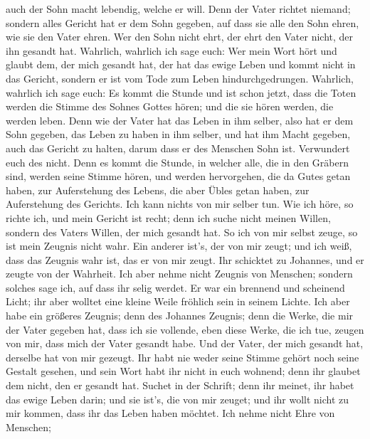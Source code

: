 auch der Sohn macht lebendig, welche er will.  Denn der
Vater richtet niemand; sondern alles Gericht hat er dem Sohn gegeben,
 auf dass sie alle den Sohn ehren, wie sie den Vater ehren.
Wer den Sohn nicht ehrt, der ehrt den Vater nicht, der ihn gesandt hat.
 Wahrlich, wahrlich ich sage euch: Wer mein Wort hört und
glaubt dem, der mich gesandt hat, der hat das ewige Leben und kommt
nicht in das Gericht, sondern er ist vom Tode zum Leben
hindurchgedrungen.  Wahrlich, wahrlich ich sage euch: Es
kommt die Stunde und ist schon jetzt, dass die Toten werden die Stimme
des Sohnes Gottes hören; und die sie hören werden, die werden leben.
 Denn wie der Vater hat das Leben in ihm selber, also hat
er dem Sohn gegeben, das Leben zu haben in ihm selber,  und
hat ihm Macht gegeben, auch das Gericht zu halten, darum dass er des
Menschen Sohn ist.  Verwundert euch des nicht. Denn es
kommt die Stunde, in welcher alle, die in den Gräbern sind, werden seine
Stimme hören,  und werden hervorgehen, die da Gutes getan
haben, zur Auferstehung des Lebens, die aber Übles getan haben, zur
Auferstehung des Gerichts.  Ich kann nichts von mir selber
tun. Wie ich höre, so richte ich, und mein Gericht ist recht; denn ich
suche nicht meinen Willen, sondern des Vaters Willen, der mich gesandt
hat.  So ich von mir selbst zeuge, so ist mein Zeugnis
nicht wahr.  Ein anderer ist's, der von mir zeugt; und ich
weiß, dass das Zeugnis wahr ist, das er von mir zeugt.  Ihr
schicktet zu Johannes, und er zeugte von der Wahrheit.  Ich
aber nehme nicht Zeugnis von Menschen; sondern solches sage ich, auf
dass ihr selig werdet.  Er war ein brennend und scheinend
Licht; ihr aber wolltet eine kleine Weile fröhlich sein in seinem
Lichte.  Ich aber habe ein größeres Zeugnis; denn des
Johannes Zeugnis; denn die Werke, die mir der Vater gegeben hat, dass
ich sie vollende, eben diese Werke, die ich tue, zeugen von mir, dass
mich der Vater gesandt habe.  Und der Vater, der mich
gesandt hat, derselbe hat von mir gezeugt. Ihr habt nie weder seine
Stimme gehört noch seine Gestalt gesehen,  und sein Wort
habt ihr nicht in euch wohnend; denn ihr glaubet dem nicht, den er
gesandt hat.  Suchet in der Schrift; denn ihr meinet, ihr
habet das ewige Leben darin; und sie ist's, die von mir zeuget;
 und ihr wollt nicht zu mir kommen, dass ihr das Leben
haben möchtet.  Ich nehme nicht Ehre von Menschen;
